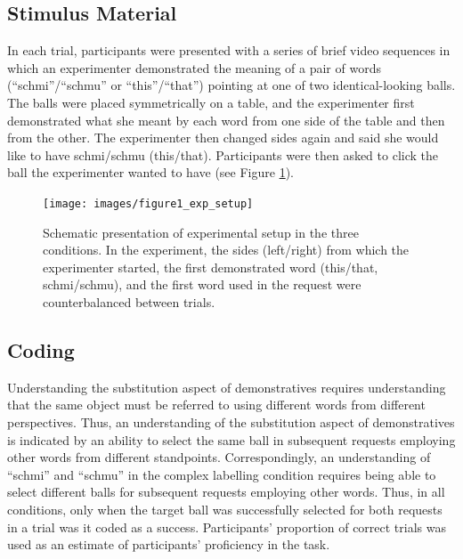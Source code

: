 \documentclass[
  man,floatsintext]{apa6}
\begin{document}
\subsection{Stimulus Material}\label{stimulus-material}

In each trial, participants were presented with a series of brief video sequences in which an experimenter demonstrated the meaning of a pair of words (``schmi''/``schmu'' or ``this''/``that'') pointing at one of two identical-looking balls. The balls were placed symmetrically on a table, and the experimenter first demonstrated what she meant by each word from one side of the table and then from the other. The experimenter then changed sides again and said she would like to have schmi/schmu (this/that). Participants were then asked to click the ball the experimenter wanted to have (see Figure \ref{fig:expsetup}).

\begin{figure}

{\centering \texttt{[image: images/figure1\_exp\_setup]} 

}

\caption{Schematic presentation of experimental setup in the three conditions. In the experiment, the sides (left/right) from which the experimenter started, the first demonstrated word (this/that, schmi/schmu), and the first word used in the request were counterbalanced between trials.}\label{fig:expsetup}
\end{figure}

\subsection{Coding}\label{coding}

Understanding the substitution aspect of demonstratives requires understanding that the same object must be referred to using different words from different perspectives. Thus, an understanding of the substitution aspect of demonstratives is indicated by an ability to select the same ball in subsequent requests employing other words from different standpoints. Correspondingly, an understanding of ``schmi'' and ``schmu'' in the complex labelling condition requires being able to select different balls for subsequent requests employing other words. Thus, in all conditions, only when the target ball was successfully selected for both requests in a trial was it coded as a success. Participants' proportion of correct trials was used as an estimate of participants' proficiency in the task.
\end{document}
